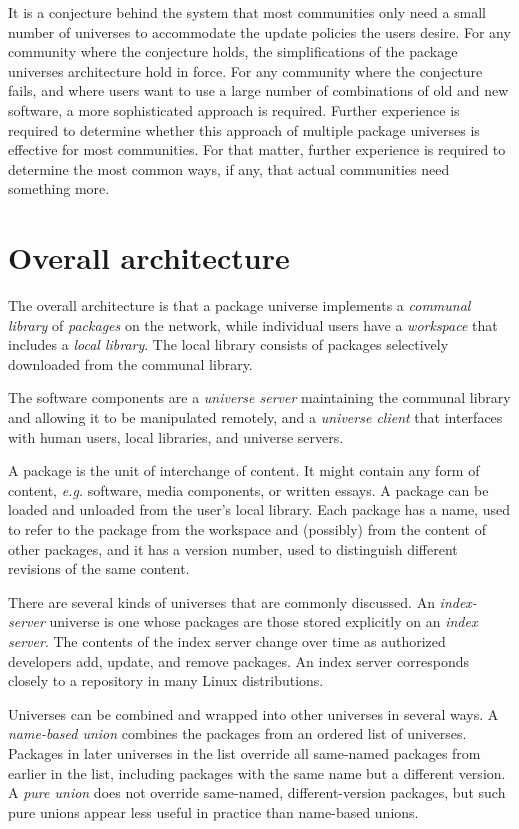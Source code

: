 \documentclass{article}
\newcommand{\eg}{\mbox{\emph{e.g.}}}
\begin{document}
It is a conjecture behind the system that most communities only need a
small number of universes to accommodate the update policies the users
desire.  For any community where the conjecture holds, the
simplifications of the package universes architecture hold in force.
For any community where the conjecture fails, and where users want to
use a large number of combinations of old and new software, a more
sophisticated approach is required.  Further experience is required to
determine whether this approach of multiple package universes is
effective for most communities.  For that matter, further experience
is required to determine the most common ways, if any, that actual
communities need something more.


\section{Overall architecture}
The overall architecture is that a package universe implements a
\emph{communal library} of \emph{packages} on the network, while
individual users have a \emph{workspace} that includes a \emph{local
library}.  The local library consists of packages selectively
downloaded from the communal library.

The software components are a \emph{universe server} maintaining the
communal library and allowing it to be manipulated remotely, and a
\emph{universe client} that interfaces with human users, local
libraries, and universe servers.

A package is the unit of interchange of content.  It might contain any
form of content, {\eg} software, media components, or written essays.
A package can be loaded and unloaded from the user's local library.
Each package has a name, used to refer to the package from the
workspace and (possibly) from the content of other packages, and it
has a version number, used to distinguish different revisions of the
same content.

There are several kinds of universes that are commonly discussed.  An
\emph{index-server} universe is one whose packages are those stored
explicitly on an \emph{index server}.  The contents of the index
server change over time as authorized developers add, update, and
remove packages.  An index server corresponds closely to a repository
in many Linux distributions.

Universes can be combined and wrapped into other universes in several
ways.  A \emph{name-based union} combines the packages from an ordered
list of universes.  Packages in later universes in the list override
all same-named packages from earlier in the list, including packages
with the same name but a different version.  A \emph{pure union} does
not override same-named, different-version packages, but such pure
unions appear less useful in practice than name-based unions.
\end{document}
